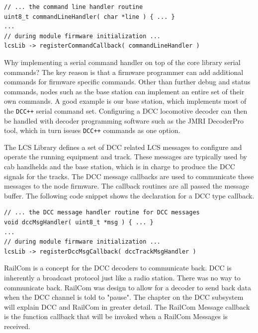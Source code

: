 \lstset{style=codesnippetstyle}
\begin{lstlisting}
// ... the command line handler routine
uint8_t commandLineHandler( char *line ) { ... }
...
// during module firmware initialization ...
lcsLib -> registerCommandCallback( commandLineHandler )
\end{lstlisting}

Why implementing a serial command handler on top of the core library serial commands? The key reason is that a firmware programmer can add additional commands for firmware specific commands. Other than further debug and status commands, nodes such as the base station can implement an entire set of their own commands. A good example is our base station, which implements most of the \texttt{DCC++} serial command set. Configuring a DCC locomotive decoder can then be handled with decoder programming software such as the JMRI DecoderPro tool, which in turn issues \texttt{DCC++} commands as one option.


The LCS Library defines a set of DCC related LCS messages to configure and operate the running equipment and track. These messages are typically used by cab handhelds and the base station, which is in charge to produce the DCC signals for the tracks. The DCC message callbacks are used to communicate these messages to the node firmware. The callback routines are all passed the message buffer. The following code snippet shows the declaration for a DCC type callback.

\lstset{style=codesnippetstyle}
\begin{lstlisting}
// ... the DCC message handler routine for DCC messages
void dccMsgHandler( uint8_t *msg ) { ... }
...
// during module firmware initialization ...
lcsLib -> registerDccMsgCallback( dccTrackMsgHandler )
\end{lstlisting}


RailCom is a concept for the DCC decoders to communicate back. DCC is inherently a broadcast protocol just like a radio station. There was no way to communicate back.  RailCom was design to allow for a decoder to send back data when the DCC channel is told to "pause". The chapter on the DCC subsystem will explain DCC and RailCom in greater detail. The RailCom Message callback is the function callback that will be invoked when a RailCom Messages is received.

